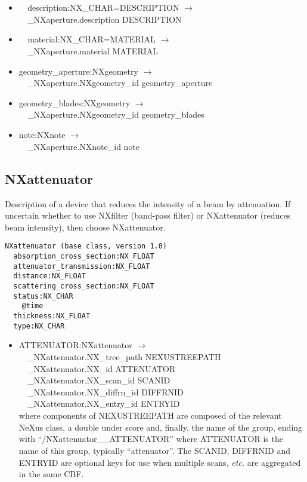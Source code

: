 \documentclass[11pt]{article}
\begin{document}
{{\begin{itemize}
\item{\verb|  |description:NX\_CHAR=DESCRIPTION $\rightarrow$\\
\verb|  |\_NXaperture.description DESCRIPTION}

\item{\verb|  |material:NX\_CHAR=MATERIAL $\rightarrow$\\
\verb|  |\_NXaperture.material MATERIAL}

\item{geometry\_aperture:NXgeometry $\rightarrow$\\
\verb|  |\_NXaperture.NXgeometry\_id geometry\_aperture}

\item{geometry\_blades:NXgeometry $\rightarrow$\\
\verb|  |\_NXaperture.NXgeometry\_id geometry\_blades}

\item{note:NXnote $\rightarrow$\\
\verb|  |\_NXaperture.NXnote\_id note}
\end{itemize}
\subsection{NXattenuator}

Description of a device that reduces the intensity of a beam by attenuation. If uncertain whether to use NXfilter (band-pass filter) or NXattenuator (reduces beam intensity), then choose NXattenuator.


\begin{verbatim}
NXattenuator (base class, version 1.0)
  absorption_cross_section:NX_FLOAT
  attenuator_transmission:NX_FLOAT
  distance:NX_FLOAT
  scattering_cross_section:NX_FLOAT
  status:NX_CHAR
    @time
  thickness:NX_FLOAT
  type:NX_CHAR
\end{verbatim}

\begin{itemize}

\item{ATTENUATOR:NXattenuator $\rightarrow$\\
\verb|  |\_NXattenuator.NX\_tree\_path    NEXUSTREEPATH \\
\verb|  |\_NXattenuator.NX\_id            ATTENUATOR\\
\verb|  |\_NXattenuator.NX\_scan\_id      SCANID \\
\verb|  |\_NXattenuator.NX\_diffrn\_id    DIFFRNID \\
\verb|  |\_NXattenuator.NX\_entry\_id     ENTRYID \\
where components of NEXUSTREEPATH are composed of the
relevant NeXus class, a double under score and, finally, the
name of the group, ending with ``/NXattenuator\_\_ATTENUATOR''
where ATTENUATOR is the name of this group, typically ``attenuator''.
The SCANID, DIFFRNID and ENTRYID are optional keys for use
when multiple scans, {\it etc.} are aggregated in the same CBF.}


\end{itemize}}}
\end{document}
